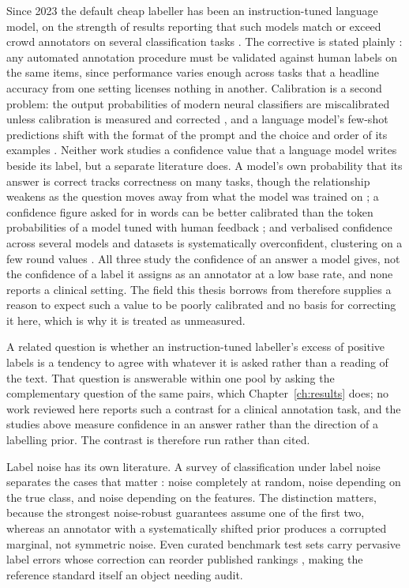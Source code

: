 Since 2023 the default cheap labeller has been an instruction-tuned language model, on the strength
of results reporting that such models match or exceed crowd annotators on several classification
tasks \citep{gilardi2023chatgpt}. The corrective is stated plainly \citep{pangakis2023validation}: any automated
annotation procedure must be validated against human labels on the same items, since performance
varies enough across tasks that a headline accuracy from one setting licenses nothing in another.
Calibration is a second problem: the output probabilities of modern neural classifiers are
miscalibrated unless calibration is measured and corrected \citep{guo2017calibration}, and a language
model's few-shot predictions shift with the format of the prompt and the choice and order of its
examples \citep{zhao2021calibrate}. Neither work studies a confidence value that a language
model writes beside its label, but a separate literature does. A model's own probability that its
answer is correct tracks correctness on many tasks, though the relationship weakens as the question
moves away from what the model was trained on \citep{kadavath2022know}; a confidence figure asked
for in words can be better calibrated than the token probabilities of a model tuned with human
feedback \citep{tian2023askcalibration}; and verbalised confidence across several models and
datasets is systematically overconfident, clustering on a few round values
\citep{xiong2024uncertainty}. All three study the confidence of an answer a model gives, not the
confidence of a label it assigns as an annotator at a low base rate, and none reports a clinical
setting. The field this thesis borrows from therefore supplies a reason to expect such a value to
be poorly calibrated and no basis for correcting it here, which is why it is treated as unmeasured.

A related question is whether an instruction-tuned labeller's excess of positive labels is a
tendency to agree with whatever it is asked rather than a reading of the text. That question is
answerable within one pool by asking the complementary question of the same pairs, which
Chapter~\ref{ch:results} does; no work reviewed here reports such a contrast for a clinical
annotation task, and the studies above measure confidence in an answer rather than the direction of
a labelling prior. The contrast is therefore run rather than cited.

Label noise has its own literature. A survey of classification under label
noise separates the cases that matter \citep{frenay2014labelnoise}: noise completely at random, noise depending on the true
class, and noise depending on the features. The distinction matters, because the strongest
noise-robust guarantees assume one of the first two, whereas an annotator with a systematically
shifted prior produces a corrupted marginal, not symmetric noise. Even curated benchmark test sets
carry pervasive label errors whose correction can reorder
published rankings \citep{northcutt2021labelerrors}, making the reference standard itself an object needing audit.

